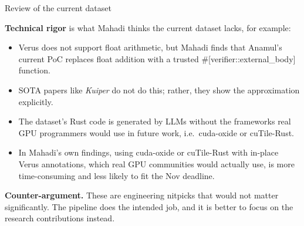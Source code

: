 \documentclass[aspectratio=169,10pt]{beamer}
\newcommand{\code}[1]{{\ttfamily #1}}
\begin{document}
\begin{frame}{Review of the current dataset}

\begin{callout}[lgAccent]
\scriptsize\raggedright
\textbf{Technical rigor} is what Mahadi thinks the current dataset lacks, for example:
\setlength\leftmargini{1.2em}
\begin{itemize}\setlength\itemsep{1pt}
  \item Verus does not support float arithmetic, but Mahadi finds that Anamul's current PoC replaces
        float addition with a trusted \code{\#[verifier::external\_body]} function.
  \item SOTA papers like \emph{Kuiper} do not do this; rather, they show the approximation explicitly.
  \item The dataset's Rust code is generated by LLMs without the frameworks real GPU programmers would use in future work,
        i.e.\ \code{cuda-oxide} or \code{cuTile-Rust}.
  \item In Mahadi's own findings, using \code{cuda-oxide} or \code{cuTile-Rust} with in-place Verus
        annotations, which real GPU communities would actually use, is more time-consuming and less
        likely to fit the Nov deadline.
\end{itemize}
\end{callout}

\vspace{6pt}
\begin{tcolorbox}[enhanced, colback=lgGreen!6, colframe=lgGreen,
  boxrule=0.1pt, leftrule=2.5pt, arc=1.5pt,
  left=6pt, right=6pt, top=4pt, bottom=4pt, boxsep=0pt]
\scriptsize\raggedright
\textbf{\color{lgGreen}Counter-argument.} These are engineering nitpicks that would not matter significantly.
The pipeline does the intended job, and it is better to focus on the research contributions instead.
\end{tcolorbox}

\end{frame}
\end{document}
